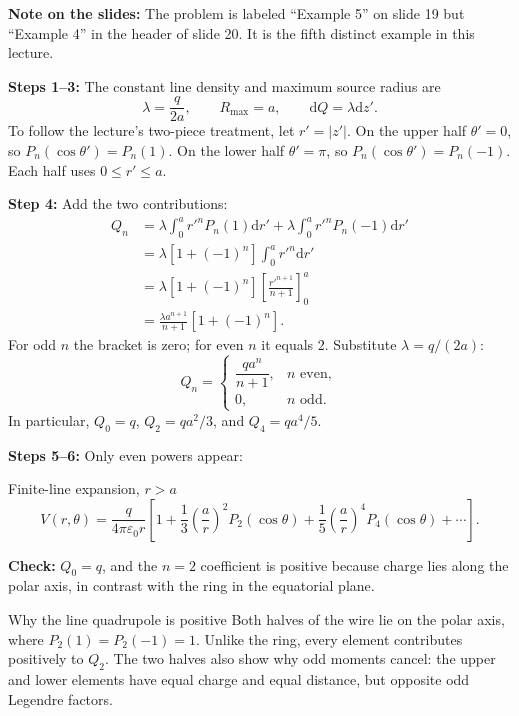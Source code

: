 \documentclass[10pt,letterpaper]{article}
\newcommand{\eps}{\varepsilon_0}\newcommand{\dd}{\mathrm d}
\begin{document}
\textbf{Note on the slides:} The problem is labeled ``Example 5'' on slide 19 but ``Example 4'' in the header of slide 20. It is the fifth distinct example in this lecture.

\begin{center}\end{center}
\textbf{Steps 1--3:} The constant line density and maximum source radius are
\[\lambda=\frac{q}{2a},\qquad R_{\max}=a,\qquad\dd Q=\lambda\dd z'.\]
To follow the lecture's two-piece treatment, let $r'=|z'|$. On the upper half $\theta'=0$, so $P_n(\cos\theta')=P_n(1)$. On the lower half $\theta'=\pi$, so $P_n(\cos\theta')=P_n(-1)$. Each half uses $0\le r'\le a$.

\textbf{Step 4:} Add the two contributions:
\begin{align*}
Q_n&=\lambda\int_0^a r'^nP_n(1)\dd r'+\lambda\int_0^a r'^nP_n(-1)\dd r'\\
&=\lambda[1+(-1)^n]\int_0^a r'^n\dd r'\\
&=\lambda[1+(-1)^n]\left[\frac{r'^{n+1}}{n+1}\right]_{0}^{a}\\
&=\frac{\lambda a^{n+1}}{n+1}[1+(-1)^n].
\end{align*}
For odd $n$ the bracket is zero; for even $n$ it equals $2$. Substitute $\lambda=q/(2a)$:
\[\boxed{Q_n=\begin{cases}\dfrac{qa^n}{n+1},&n\text{ even},\\0,&n\text{ odd}.\end{cases}}\]
In particular, $Q_0=q$, $Q_2=qa^2/3$, and $Q_4=qa^4/5$.

\textbf{Steps 5--6:} Only even powers appear:
\begin{result}{Finite-line expansion, $r>a$}
\[\boxed{V(r,\theta)=\frac{q}{4\pi\eps r}\left[1+\frac13\left(\frac ar\right)^2P_2(\cos\theta)+\frac15\left(\frac ar\right)^4P_4(\cos\theta)+\cdots\right].}\]
\end{result}
\textbf{Check:} $Q_0=q$, and the $n=2$ coefficient is positive because charge lies along the polar axis, in contrast with the ring in the equatorial plane.
\begin{insight}{Why the line quadrupole is positive}
Both halves of the wire lie on the polar axis, where $P_2(1)=P_2(-1)=1$. Unlike the ring, every element contributes positively to $Q_2$. The two halves also show why odd moments cancel: the upper and lower elements have equal charge and equal distance, but opposite odd Legendre factors.
\end{insight}
\end{document}
